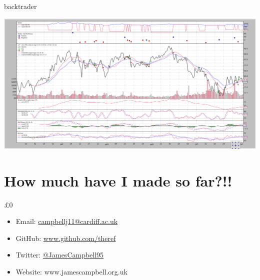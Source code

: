 \documentclass{beamer}
\begin{document}
\begin{frame}{backtrader}
  \begin{center}
    \includegraphics[scale=0.21]{images/quickstart}
  \end{center}
\end{frame}

\section{How much have I made so far?!!}

\begin{frame}{}
  \begin{center}
    {\fontsize{5cm}{5.5cm} \selectfont £0}
  \end{center}
\end{frame}

\begin{frame}[standout]
  \begin{itemize}
    \itemsep2em
    \item Email: \href{mailto:campbellj11@cardiff.ac.uk}{campbellj11@cardiff.ac.uk}

    \item GitHub: \href{https://github.com/theref}{www.github.com/theref}

    \item Twitter: \href{https://twitter.com/JamesCampbell95}{@JamesCampbell95}

    \item Website: www.jamescampbell.org.uk
  \end{itemize}
\end{frame}

\begin{frame}[allowframebreaks]
  \printbibliography
\end{frame}
\end{document}
